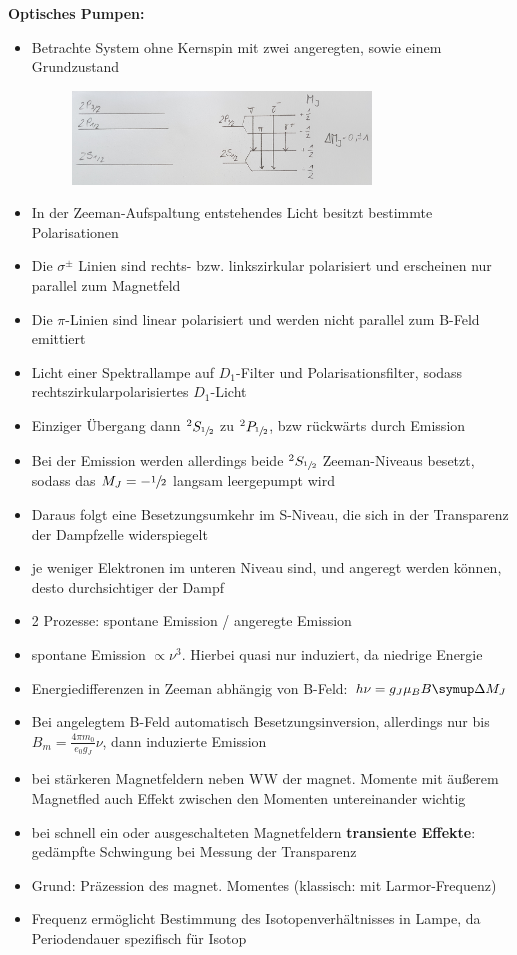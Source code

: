 \textbf{Optisches Pumpen:}
\begin{itemize}
    \item Betrachte System ohne Kernspin mit zwei angeregten, sowie einem Grundzustand
      \begin{figure}[htb]
          \centering
          \includegraphics[width=0.75\textwidth]{figures/beispiel.jpg}
        \end{figure}
    \item In der Zeeman-Aufspaltung entstehendes Licht besitzt bestimmte Polarisationen
    \item Die $\sigma^\pm$ Linien sind rechts- bzw. linkszirkular polarisiert und erscheinen nur parallel zum Magnetfeld
    \item Die $\pi$-Linien sind linear polarisiert und werden nicht parallel zum B-Feld emittiert
    \item Licht einer Spektrallampe auf $D_1$-Filter und Polarisationsfilter, sodass rechtszirkularpolarisiertes $D_1$-Licht
    \item Einziger Übergang dann $^2S_{\sfrac{1}{2}}$ zu $^2P_{\sfrac{1}{2}}$, bzw rückwärts durch Emission
    \item Bei der Emission werden allerdings beide $^2S_{\sfrac{1}{2}}$ Zeeman-Niveaus besetzt, sodass das $M_J = -\sfrac{1}{2}$ langsam leergepumpt wird
    \item Daraus folgt eine Besetzungsumkehr im S-Niveau, die sich in der Transparenz der Dampfzelle widerspiegelt
    \item je weniger Elektronen im unteren Niveau sind, und angeregt werden können, desto durchsichtiger der Dampf
    \item 2 Prozesse: spontane Emission / angeregte Emission
    \item spontane Emission $\propto \nu^3$. Hierbei quasi nur induziert, da niedrige Energie
    \item Energiedifferenzen in Zeeman abhängig von B-Feld: $h\nu = g_J\mu_BB\upD M_J$
    \item Bei angelegtem B-Feld automatisch Besetzungsinversion, allerdings nur bis $B_m = \frac{4\pi m_0}{e_0g_J}\nu$, dann induzierte Emission
    \item bei stärkeren Magnetfeldern neben WW der magnet. Momente mit äußerem Magnetfled auch Effekt zwischen den Momenten untereinander wichtig
    \item bei schnell ein oder ausgeschalteten Magnetfeldern \textbf{transiente Effekte}: gedämpfte Schwingung bei Messung der Transparenz
    \item Grund: Präzession des magnet. Momentes (klassisch: mit Larmor-Frequenz)
    \item Frequenz ermöglicht Bestimmung des Isotopenverhältnisses in Lampe, da Periodendauer spezifisch für Isotop
\end{itemize}

